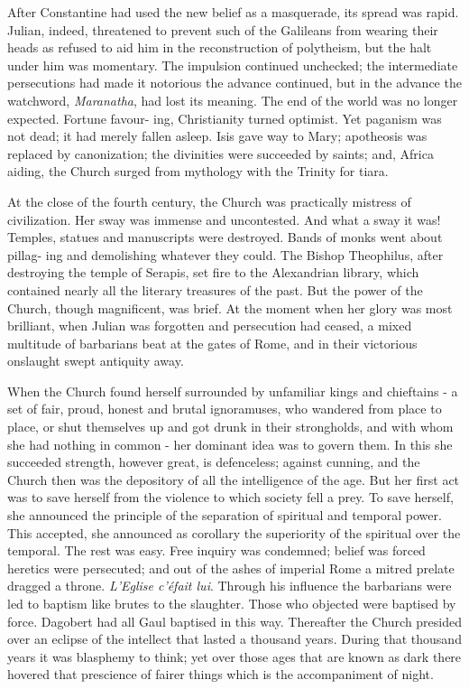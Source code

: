 \documentclass[]{book}
\begin{document}
After Constantine had used the new belief as a masquerade, its spread
was rapid. Julian, indeed, threatened to prevent such of the Galileans
from wearing their heads as refused to aid him in the reconstruction of
polytheism, but the halt under him was momentary. The impulsion
continued unchecked; the intermediate persecutions had made it notorious
the advance continued, but in the advance the watchword,
\emph{Maranatha}, had lost its meaning. The end of the world was no
longer expected. Fortune favour- ing, Christianity turned optimist. Yet
paganism was not dead; it had merely fallen asleep. Isis gave way to
Mary; apotheosis was replaced by canonization; the divinities were
succeeded by saints; and, Africa aiding, the Church surged from
mythology with the Trinity for tiara.

At the close of the fourth century, the Church was practically mistress
of civilization. Her sway was immense and uncontested. And what a sway
it was! Temples, statues and manuscripts were destroyed. Bands of monks
went about pillag- ing and demolishing whatever they could. The Bishop
Theophilus, after destroying the temple of Serapis, set fire to the
Alexandrian library, which contained nearly all the literary treasures
of the past. But the power of the Church, though magnificent, was brief.
At the moment when her glory was most brilliant, when Julian was
forgotten and persecution had ceased, a mixed multitude of barbarians
beat at the gates of Rome, and in their victorious onslaught swept
antiquity away.

When the Church found herself surrounded by unfamiliar kings and
chieftains - a set of fair, proud, honest and brutal ignoramuses, who
wandered from place to place, or shut themselves up and got drunk in
their strongholds, and with whom she had nothing in common - her
dominant idea was to govern them. In this she succeeded strength,
however great, is defenceless; against cunning, and the Church then was
the depository of all the intelligence of the age. But her first act was
to save herself from the violence to which society fell a prey. To save
herself, she announced the principle of the separation of spiritual and
temporal power. This accepted, she announced as corollary the
superiority of the spiritual over the temporal. The rest was easy. Free
inquiry was condemned; belief was forced heretics were persecuted; and
out of the ashes of imperial Rome a mitred prelate dragged a throne.
\emph{L'Eglise c'éfait lui}. Through his influence the barbarians were
led to baptism like brutes to the slaughter. Those who objected were
baptised by force. Dagobert had all Gaul baptised in this way.
Thereafter the Church presided over an eclipse of the intellect that
lasted a thousand years. During that thousand years it was blasphemy to
think; yet over those ages that are known as dark there hovered that
prescience of fairer things which is the accompaniment of night.
\end{document}
